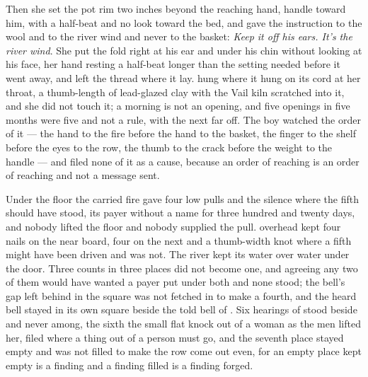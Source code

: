 Then she set the pot rim two inches beyond the reaching hand, handle toward him, with a half-beat and no look toward the bed, and gave the instruction to the wool and to the river wind and never to the basket: \emph{Keep it off his ears. It's the river wind}. She put the fold right at his ear and under his chin without looking at his face, her hand resting a half-beat longer than the setting needed before it went away, and left the thread where it lay.  hung where it hung on its cord at her throat, a thumb-length of lead-glazed clay with the Vail kiln scratched into it, and she did not touch it; a morning is not an opening, and five openings in five months were five and not a rule, with the next far off. The boy watched the order of it --- the hand to the fire before the hand to the basket, the finger to the shelf before the eyes to the row, the thumb to the crack before the weight to the handle --- and filed none of it as a cause, because an order of reaching is an order of reaching and not a message sent.

\scenebreak

Under the floor the carried fire gave four low pulls and the silence where the fifth should have stood, its payer without a name for three hundred and twenty days, and nobody lifted the floor and nobody supplied the pull.  overhead kept four nails on the near board, four on the next and a thumb-width knot where a fifth might have been driven and was not. The river kept its water over water under the door. Three counts in three places did not become one, and agreeing any two of them would have wanted a payer put under both and none stood; the bell's gap left behind in the square was not fetched in to make a fourth, and the heard bell stayed in its own square beside the told bell of . Six hearings of  stood beside and never among, the sixth the small flat knock out of a woman as the men lifted her, filed where a thing out of a person must go, and the seventh place stayed empty and was not filled to make the row come out even, for an empty place kept empty is a finding and a finding filled is a finding forged.

